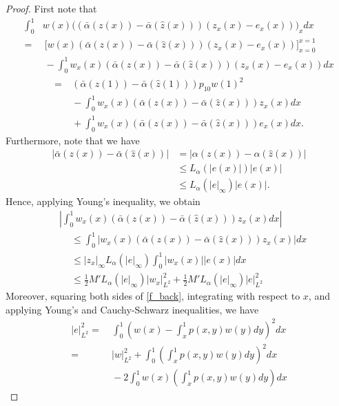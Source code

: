 \documentclass[10pt,a4paper]{amsart}
\begin{document}
\begin{proof}
First note that 
\begin{align}
\int_{0}^{1}&w(x)\big(\left(\bar{\alpha}(z(x))-\bar{\alpha}(\hat{z}(x))\right)(z_x(x)-e_x(x))\big)_x dx \nonumber \\
=&~ \bigg[w(x)\left(\bar{\alpha}(z(x))-\bar{\alpha}(\hat{z}(x))\right)(z_x(x)-e_x(x))\bigg]_{x=0}^{x=1} \nonumber\\
&~-\int_{0}^{1}w_x(x)\left(\bar{\alpha}(z(x))-\bar{\alpha}(\hat{z}(x))\right)(z_x(x)-e_x(x))dx \nonumber 
\end{align}
\begin{align}
=&~\left(\bar{\alpha}(z(1))-\bar{\alpha}(\hat{z}(1))\right)p_{10}w(1)^2 \nonumber\\
&~-\int_{0}^{1}w_x(x)\left(\bar{\alpha}(z(x))-\bar{\alpha}(\hat{z}(x))\right)z_x(x)dx \nonumber \\
&~+\int_{0}^{1}w_x(x)\left(\bar{\alpha}(z(x))-\bar{\alpha}(\hat{z}(x))\right)e_x(x)dx. \label{first_1}
\end{align}
Furthermore, note that we have
\begin{align*}
|\bar{\alpha}(z(x))-\bar{\alpha}(\hat{z}(x))| &= |\alpha(z(x))-\alpha(\hat{z}(x))|\\
&\leq L_{\alpha}(|e(x)|)|e(x)| \\
&\leq L_{\alpha}(|e|_{\infty})|e(x)|. 
\end{align*}
Hence, applying Young's inequality, we obtain
\begin{align*}
&\left|\int_{0}^{1}w_x(x)\left(\bar{\alpha}(z(x))-\bar{\alpha}(\hat{z}(x))\right)z_x(x)dx\right| \\
&~\quad \leq \int_{0}^{1}\left|w_x(x)\left(\bar{\alpha}(z(x))-\bar{\alpha}(\hat{z}(x))\right)z_x(x)\right|dx \\
&~\quad \leq |z_x|_{\infty}L_{\alpha}(|e|_{\infty})\int_{0}^{1}|w_x(x)| |e(x)|dx \\
&~\quad \leq \frac{1}{2}M'L_{\alpha}(|e|_{\infty})|w_x|_{L^2}^2 + \frac{1}{2}M'L_{\alpha}(|e|_{\infty})|e|_{L^2}^2
\end{align*}
Moreover, squaring both sides of \eqref{f_back}, integrating with respect to $x$, and applying Young's and Cauchy-Schwarz inequalities, we have 
\begin{align}
|e|_{L^2}^2 =&~ \int_{0}^{1}\left(w(x) - \int_x^1 p(x,y)w(y)dy\right)^2dx \nonumber \\ 
=&~ |w|_{L^2}^2+\int_{0}^{1}\left(\int_x^1 p(x,y)w(y)dy\right)^2dx \nonumber\\
&~-2\int_{0}^{1}w(x)\left(\int_x^1 p(x,y)w(y)dy\right)dx\nonumber 

\end{align}
\end{proof}
\end{document}
